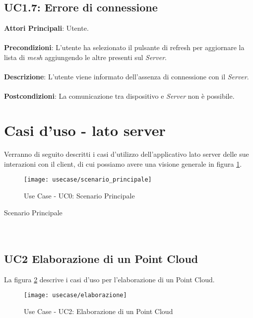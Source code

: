 \subsection{UC1.7: Errore di connessione}
\textbf{Attori Principali}: Utente.
\\\\ \textbf{Precondizioni}: L'utente ha selezionato il pulsante di refresh per aggiornare la lista di \emph{mesh} aggiungendo le altre presenti sul \emph{Server}.
\\\\ \textbf{Descrizione}: L'utente viene informato dell'assenza di connessione con il \emph{Server}.
\\\\ \textbf{Postcondizioni}: La comunicazione tra dispositivo e \emph{Server} non è possibile.



\section{Casi d'uso - lato server}
Verranno di seguito descritti i casi d'utilizzo dell'applicativo lato server delle sue interazioni con il client, di cui possiamo avere una visione generale in figura \ref{fig:scenario_principale}.
\begin{figure}[!h] 
    \centering 
    \texttt{[image: usecase/scenario\_principale]} 
    \caption{Use Case - UC0: Scenario Principale}
    \label{fig:scenario_principale}
\end{figure}
\newpage
\begin{usecase}{0}{Scenario Principale}
\\ 
\\ 
\\ 
\label{uc:scenario_principale}
\end{usecase}

\subsection{UC2 Elaborazione di un Point Cloud}
La figura \ref{fig:elaborazione} descrive i casi d'uso per l'elaborazione di un Point Cloud.
\begin{figure}[!h] 
    \centering 
    \texttt{[image: usecase/elaborazione]} 
    \caption{Use Case - UC2: Elaborazione di un Point Cloud}
    \label{fig:elaborazione}
\end{figure}

